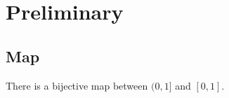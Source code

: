 \chapter{Preliminary}

\section{Map}

\begin{theorem}
There is a bijective map between $(0, 1]$ and $[0, 1]$. 
\end{theorem}









